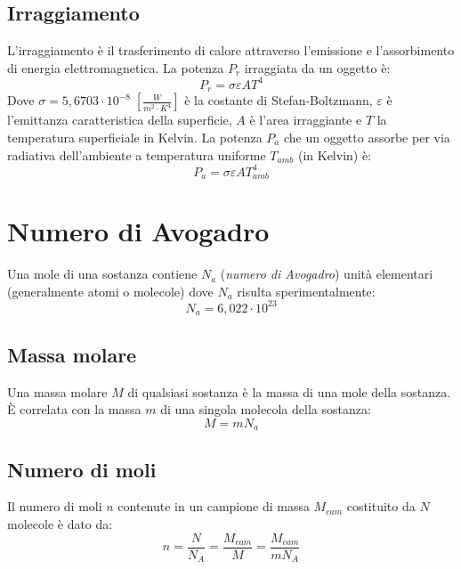             \subsection{Irraggiamento} L'irraggiamento è il trasferimento di 
            calore attraverso l'emissione e l'assorbimento di energia 
            elettromagnetica. La potenza $P_r$ irraggiata da un oggetto è:
                \begin{equation}
                    P_r = \sigma \varepsilon AT^4
                \end{equation}
            Dove $\sigma = 5,6703 \cdot 10^{-8} \; [\frac{W}{m^2 \cdot K^4}
            ]$ è la costante di Stefan-Boltzmann, $\varepsilon$ è l'emittanza
            caratteristica della superficie, $A$ è l'area irraggiante e $T$ la 
            temperatura superficiale in Kelvin. La potenza $P_a$ che un oggetto
            assorbe per via radiativa dell'ambiente a temperatura uniforme
            $T_{amb}$ (in Kelvin) è:
                \begin{equation}
                    P_a = \sigma \varepsilon AT^4_{amb}
                \end{equation}

    \section{Numero di Avogadro} Una mole di una sostanza contiene $N_a$
    (\textit{numero di Avogadro}) unità elementari (generalmente atomi o 
    molecole) dove $N_a$ risulta sperimentalmente:
        \begin{equation*}
            N_a = 6,022 \cdot 10^{23}
        \end{equation*}

        \subsection{Massa molare} Una massa molare $M$ di qualsiasi sostanza è
        la massa di una mole della sostanza. È correlata con la massa $m$ di 
        una singola molecola della sostanza:
            \begin{equation}
                M = mN_a
            \end{equation}
        
        \subsection{Numero di moli} Il numero di moli $n$ contenute in un 
        campione di massa $M_{cam}$ costituito da $N$ molecole è dato da:
            \begin{equation}
                n = \frac{N}{N_A} = \frac{M_{cam}}{M} = \frac{M_{cam}}{mN_A}
            \end{equation}

